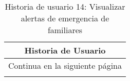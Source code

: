 

\begin{longtable}{|p{6.7cm}|p{6.7cm}|}
    \caption{Historia de usuario 14: Visualizar alertas de emergencia de familiares} \label{tab:historia-14}
    \\
    \hline
    \multicolumn{2}{|c|}{\textbf{Historia de Usuario}}                                                                                                                                               \\
    \hline

    \endfirsthead

    \hline
    \endhead

    \hline
    \multicolumn{2}{|c|}{{Continua en la siguiente página}}                                                                                                                                          \\
    \hline
    \endfoot

    \hline
    \endlastfoot


\end{longtable}
